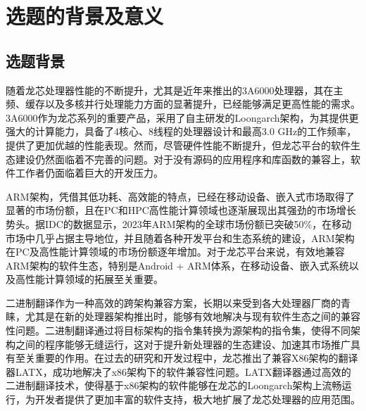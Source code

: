 \section{选题的背景及意义}

\subsection{选题背景}

随着龙芯处理器性能的不断提升，尤其是近年来推出的3A6000处理器，其在主频、缓存以及多核并行处理能力方面的显著提升，已经能够满足更高性能的需求。3A6000作为龙芯系列的重要产品，采用了自主研发的Loongarch架构，为其提供更强大的计算能力，具备了4核心、8线程的处理器设计和最高3.0 GHz的工作频率，提供了更加优越的性能表现。然而，尽管硬件性能不断提升，但龙芯平台的软件生态建设仍然面临着不完善的问题。对于没有源码的应用程序和库函数的兼容上，软件工作者仍面临着巨大的开发压力。

ARM架构，凭借其低功耗、高效能的特点，已经在移动设备、嵌入式市场取得了显著的市场份额，且在PC和HPC高性能计算领域也逐渐展现出其强劲的市场增长势头。据IDC的数据显示，2023年ARM架构的全球市场份额已突破50{\%}，在移动市场中几乎占据主导地位，并且随着各种开发平台和生态系统的建设，ARM架构在PC及高性能计算领域的市场份额逐年增加。对于龙芯平台来说，有效地兼容ARM架构的软件生态，特别是Android + ARM体系，在移动设备、嵌入式系统以及高性能计算领域的拓展至关重要。

二进制翻译作为一种高效的跨架构兼容方案，长期以来受到各大处理器厂商的青睐，尤其是在新的处理器架构推出时，能够有效地解决与现有软件生态之间的兼容性问题。二进制翻译通过将目标架构的指令集转换为源架构的指令集，使得不同架构之间的程序能够无缝运行，这对于提升新处理器的生态建设、加速其市场推广具有至关重要的作用。在过去的研究和开发过程中，龙芯推出了兼容X86架构的翻译器LATX，成功地解决了x86架构下的软件兼容性问题。LATX翻译器通过高效的二进制翻译技术，使得基于x86架构的软件能够在龙芯的Loongarch架构上流畅运行，为开发者提供了更加丰富的软件支持，极大地扩展了龙芯处理器的应用范围。


